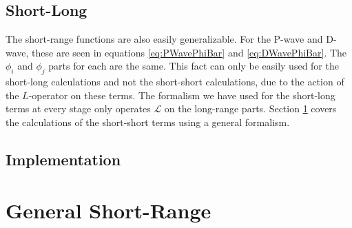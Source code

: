 \documentclass[Dissertation.tex]{subfiles}
\begin{document}


\subsection{Short-Long}
\label{sec:GeneralShortLong}
The short-range functions are also easily generalizable. For the P-wave and D-wave, these are seen in equations \ref{eq:PWavePhiBar} and \ref{eq:DWavePhiBar}. The $\phi_i$ and $\phi_j$ parts for each are the same. This fact can only be easily used for the short-long calculations and not the short-short calculations, due to the action of the $L$-operator on these terms. The formalism we have used for the short-long terms at every stage only operates $\mathcal{L}$ on the long-range parts. Section \ref{sec:GeneralShort} covers the calculations of the short-short terms using a general formalism.

\subsection{Implementation}
\label{sec:GeneralLongImp}



\section{General Short-Range}
\label{sec:GeneralShort}
\end{document}
